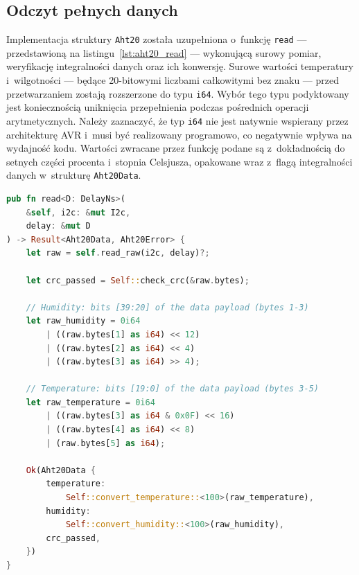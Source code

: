 \subsection*{Odczyt pełnych danych}
Implementacja struktury \texttt{Aht20} została uzupełniona o~funkcję 
\texttt{read} --- przedstawioną na listingu~\ref{lst:aht20_read} --- wykonującą 
surowy pomiar, weryfikację integralności danych oraz ich konwersję. 
Surowe wartości temperatury i~wilgotności --- będące 20-bitowymi liczbami całkowitymi 
bez znaku --- przed przetwarzaniem zostają rozszerzone do typu 
\texttt{i64}. Wybór tego typu podyktowany jest koniecznością uniknięcia 
przepełnienia podczas pośrednich operacji arytmetycznych. 
Należy zaznaczyć, że typ \texttt{i64} nie jest natywnie wspierany przez 
architekturę AVR i~musi być realizowany programowo, co negatywnie wpływa na 
wydajność kodu. 
Wartości zwracane przez funkcję podane są z~dokładnością do setnych części 
procenta i~stopnia Celsjusza, opakowane wraz z~flagą integralności danych 
w~strukturę \texttt{Aht20Data}.

\begin{lstlisting}[language=Rust, style=colouredRust, caption={Odczyt danych modułu AHT20},
                   label={lst:aht20_read}]
pub fn read<D: DelayNs>(
    &self, i2c: &mut I2c, 
    delay: &mut D
) -> Result<Aht20Data, Aht20Error> {
    let raw = self.read_raw(i2c, delay)?;

    let crc_passed = Self::check_crc(&raw.bytes);

    // Humidity: bits [39:20] of the data payload (bytes 1-3)
    let raw_humidity = 0i64
        | ((raw.bytes[1] as i64) << 12)
        | ((raw.bytes[2] as i64) << 4)
        | ((raw.bytes[3] as i64) >> 4);

    // Temperature: bits [19:0] of the data payload (bytes 3-5)
    let raw_temperature = 0i64
        | ((raw.bytes[3] as i64 & 0x0F) << 16)
        | ((raw.bytes[4] as i64) << 8)
        | (raw.bytes[5] as i64);

    Ok(Aht20Data {
        temperature: 
            Self::convert_temperature::<100>(raw_temperature),
        humidity: 
            Self::convert_humidity::<100>(raw_humidity),
        crc_passed,
    })
}
\end{lstlisting}
